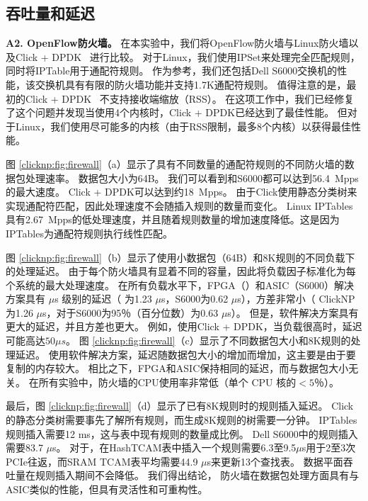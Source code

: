 \subsection{吞吐量和延迟}


\textbf {A2. OpenFlow防火墙。}
在本实验中，我们将OpenFlow防火墙与Linux防火墙以及Click + DPDK~ \cite {barbette2015fast}进行比较。
对于Linux，我们使用IPSet来处理完全匹配规则，同时将IPTable用于通配符规则。
作为参考，我们还包括Dell S6000交换机的性能，该交换机具有有限的防火墙功能并支持1.7K通配符规则。
值得注意的是，最初的Click + DPDK~ \cite {barbette2015fast}不支持接收端缩放（RSS）。
在这项工作中，我们已经修复了这个问题并发现当使用4个内核时，Click + DPDK已经达到了最佳性能。
但对于Linux，我们使用尽可能多的内核（由于RSS限制，最多8个内核）以获得最佳性能。

图 \ref {clicknp:fig:firewall}（a）显示了具有不同数量的通配符规则的不同防火墙的数据包处理速率。
数据包大小为64B。
我们可以看到\name 和S6000都可以达到56.4~Mpps的最大速度。
Click + DPDK可以达到约18~Mpps。
由于Click使用静态分类树来实现通配符匹配，因此处理速度不会随插入规则的数量而变化。
Linux IPTables具有2.67~Mpps的低处理速度，并且随着规则数量的增加速度降低。这是因为IPTables为通配符规则执行线性匹配。

图 \ref {clicknp:fig:firewall}（b）显示了使用小数据包（64B）和8K规则的不同负载下的处理延迟。
由于每个防火墙具有显着不同的容量，因此将负载因子标准化为每个系统的最大处理速度。
在所有负载水平下，FPGA（\name{}）和ASIC（S6000）解决方案具有 $\mu$s 级别的延迟（\name{} 为1.23 $\mu$s，S6000为0.62 $\mu$s），方差非常小（ ClickNP为1.26 $\mu$s，对于S6000为95％（百分位数）为0.63 $\mu$s）。
但是，软件解决方案具有更大的延迟，并且方差也更大。
例如，使用Click + DPDK，当负载很高时，延迟可能高达$ 50 \mu{}s $。
图 \ref {clicknp:fig:firewall}（c）显示了不同数据包大小和8K规则的处理延迟。
使用软件解决方案，延迟随数据包大小的增加而增加，这主要是由于要复制的内存较大。
相比之下，FPGA和ASIC保持相同的延迟，而与数据包大小无关。
在所有实验中，\name 防火墙的CPU使用率非常低（单个 CPU 核的$ <5 ％$）。

最后，图 \ref {clicknp:fig:firewall}（d）显示了已有8K规则时的规则插入延迟。 Click的静态分类树需要事先了解所有规则，而生成8K规则的树需要一分钟。
IPTables规则插入需要12 ms，这与表中现有规则的数量成比例。
Dell S6000中的规则插入需要83.7 $\mu$s。
对于\name{}，在HashTCAM表中插入一个规则需要6.3至9.5$\mu$s用于2至3次PCIe往返，而SRAM TCAM表平均需要44.9 $\mu$s来更新13个查找表。
\name 数据平面吞吐量在规则插入期间不会降低。
我们得出结论，\name{} 防火墙在数据包处理方面具有与ASIC类似的性能，但具有灵活性和可重构性。


